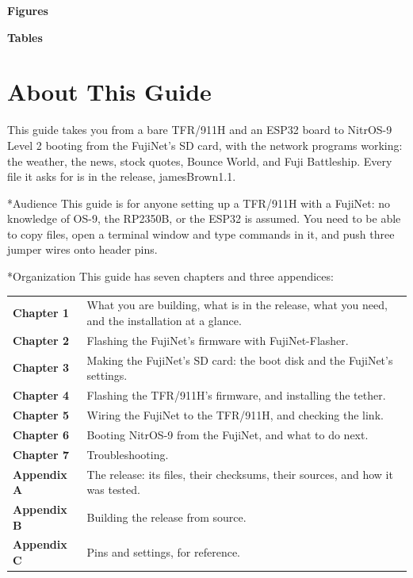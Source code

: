 \documentclass[10pt,twoside,openany]{book}
\makeatletter
\newcommand{\release}{jamesBrown1.1}
\newcommand{\thesectname}{}
\renewcommand{\section}{\@startsection{section}{1}{0pt}{3.2ex plus 1ex}{1.2ex}%
  {\sffamily\bfseries\large}}
\makeatother
\begin{document}
\clearpage
\renewcommand{\thesectname}{Figures and Tables}
{\sffamily\bfseries\large Figures\par}\vspace{1ex}
\makeatletter{}\makeatother
\vspace{3ex}
{\sffamily\bfseries\large Tables\par}\vspace{1ex}
\makeatletter{}\makeatother

\chapter*{About This Guide}
\renewcommand{\thesectname}{About This Guide}

This guide takes you from a bare TFR/911H and an ESP32 board to NitrOS-9
Level 2 booting from the FujiNet's SD card, with the network programs
working: the weather, the news, stock quotes, Bounce World, and Fuji
Battleship. Every file it asks for is in the release, \release.

\section*{Audience}
This guide is for anyone setting up a TFR/911H with a FujiNet: no
knowledge of OS-9, the RP2350B, or the ESP32 is assumed. You need to be
able to copy files, open a terminal window and type commands in it, and
push three jumper wires onto header pins.

\section*{Organization}
This guide has seven chapters and three appendices:

\begin{tabularx}{\linewidth}{@{}>{\bfseries}l X@{}}
Chapter 1 & What you are building, what is in the release, what you
need, and the installation at a glance.\\
Chapter 2 & Flashing the FujiNet's firmware with FujiNet-Flasher.\\
Chapter 3 & Making the FujiNet's SD card: the boot disk and the
FujiNet's settings.\\
Chapter 4 & Flashing the TFR/911H's firmware, and installing the
tether.\\
Chapter 5 & Wiring the FujiNet to the TFR/911H, and checking the link.\\
Chapter 6 & Booting NitrOS-9 from the FujiNet, and what to do next.\\
Chapter 7 & Troubleshooting.\\
Appendix A & The release: its files, their checksums, their sources, and
how it was tested.\\
Appendix B & Building the release from source.\\
Appendix C & Pins and settings, for reference.\\
\end{tabularx}
\end{document}
